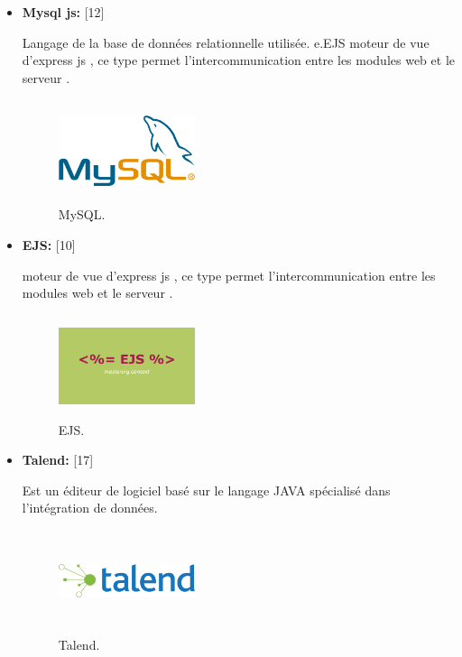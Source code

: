 \begin{itemize}
\item {  \textbf{ Mysql js:} } [12]


Langage de la base de donn\'{e}es relationnelle utilis\'{e}e.
e.EJS moteur de vue d'express js , ce type permet l'intercommunication entre
les modules web et le serveur . \newline
\FloatBarrier
\begin{figure}[H]
\center
\includegraphics[width=4cm,height=3cm]{./figures/teklogos/mysql.png}
\caption{MySQL.}
\end{figure}
\FloatBarrier

\item {  \textbf{ EJS:} } [10]


moteur de vue d'express js , ce type permet l'intercommunication entre
les modules web et le serveur . \newline

\begin{figure}[H]
\center
\includegraphics[width=4cm,height=3cm]{./figures/teklogos/ejs.png}
\caption{EJS.}
\end{figure}


\item {  \textbf{ Talend:} } [17]


 Est un éditeur de logiciel basé sur le langage JAVA spécialisé dans l'intégration de données.


\begin{figure}[H]
\center
\includegraphics[width=4cm,height=3cm]{./figures/teklogos/talend.png}
\caption{Talend.}
\end{figure}



\end{itemize}

